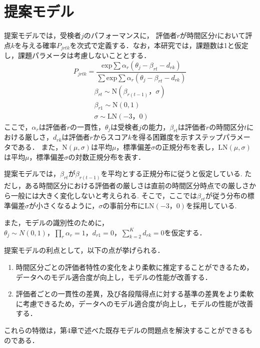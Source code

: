 \documentclass[a4paper,11pt,oneside,openany]{jsbook}
\begin{document}
\chapter{提案モデル}
提案モデルでは，受検者$j$のパフォーマンスに， 評価者$r$が時間区分$t$において評点$k$を与える確率$P_{jrtk}$を次式で定義する．なお，本研究では，課題数は1と仮定し，課題パラメータは考慮しないこととする．
\begin{equation}
P_{jrtk}=\frac{\mathrm{exp}\sum{\alpha_r(\theta_{j}-\beta_{rt}-d_{rk})}}{\sum \mathrm{exp}\sum{\alpha_r(\theta_{j}-\beta_{rt}-d_{rk})}}
\end{equation}
\begin{eqnarray}
  \beta_{rt}\sim \mathrm{N}(\beta_{r(t-1)}，\sigma)\nonumber\\
  \beta_{r1} \sim \mathrm{N}(0,1)\nonumber\\
  \sigma \sim \mathrm{LN}(-3，0)\nonumber
\end{eqnarray}
ここで，$\alpha_{r}$は評価者$r$の一貫性，$\theta_{j}$は受検者$j$の能力，$\beta_{rt}は$評価者$r$の時間区分$t$における厳しさ，$d_{rk}$は評価者$r$からスコア$k$を得る困難度を示すステップパラメータである．
また，$\mathrm{N}(\mu,\sigma)$は平均$\mu$，標準偏差$\sigma$の正規分布を表し，$\mathrm{LN}(\mu,\sigma)$は平均$\mu$，標準偏差$\sigma$の対数正規分布を表す．

提案モデルでは，$\beta_{rt}$が$\beta_{r(t-1)}$を平均とする正規分布に従うと仮定している.
ただし，ある時間区分における評価者の厳しさは直前の時間区分時点での厳しさから一般には大きく変化しないと考えられる.
そこで，ここでは$\beta_{rt}$が従う分布の標準偏差$\sigma$が小さくなるように，$\sigma$の事前分布に$\mathrm{LN}(−3，0)$を採用している.

また，モデルの識別性のために，$\theta_{j}\sim N(0,1)，\prod_{r}\alpha_r=1，d_{r1}=0，\sum_{k=2}^{K}d_{rk}=0$を仮定する．

提案モデルの利点として，以下の点が挙げられる．
\begin{enumerate}
  \item 時間区分ごとの評価者特性の変化をより柔軟に推定することができるため，データへのモデル適合度が向上し，モデルの性能が改善する．
  \item 評価者ごとの一貫性の差異，及び各段階得点に対する基準の差異をより柔軟に考慮できるため，データへのモデル適合度が向上し，モデルの性能が改善する．
\end{enumerate}
これらの特徴は，第4章で述べた既存モデルの問題点を解決することができるものである．
\end{document}
